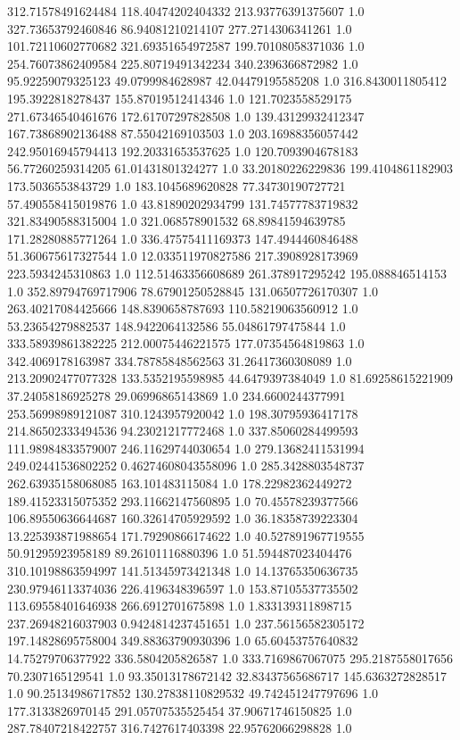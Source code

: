312.71578491624484	118.40474202404332	213.93776391375607	1.0
327.73653792460846	86.94081210214107	277.2714306341261	1.0
101.72110602770682	321.69351654972587	199.70108058371036	1.0
254.76073862409584	225.80719491342234	340.2396366872982	1.0
95.92259079325123	49.0799984628987	42.04479195585208	1.0
316.8430011805412	195.3922818278437	155.87019512414346	1.0
121.7023558529175	271.67346540461676	172.61707297828508	1.0
139.43129932412347	167.73868902136488	87.55042169103503	1.0
203.16988356057442	242.95016945794413	192.20331653537625	1.0
120.7093904678183	56.77260259314205	61.01431801324277	1.0
33.20180226229836	199.4104861182903	173.5036553843729	1.0
183.1045689620828	77.34730190727721	57.490558415019876	1.0
43.81890202934799	131.74577783719832	321.83490588315004	1.0
321.068578901532	68.89841594639785	171.28280885771264	1.0
336.47575411169373	147.4944460846488	51.360675617327544	1.0
12.033511970827586	217.3908928173969	223.5934245310863	1.0
112.51463356608689	261.378917295242	195.088846514153	1.0
352.89794769717906	78.67901250528845	131.06507726170307	1.0
263.40217084425666	148.8390658787693	110.58219063560912	1.0
53.23654279882537	148.9422064132586	55.04861797475844	1.0
333.58939861382225	212.00075446221575	177.07354564819863	1.0
342.4069178163987	334.78785848562563	31.26417360308089	1.0
213.20902477077328	133.5352195598985	44.6479397384049	1.0
81.69258615221909	37.24058186925278	29.06996865143869	1.0
234.6600244377991	253.56998989121087	310.1243957920042	1.0
198.30795936417178	214.86502333494536	94.23021217772468	1.0
337.85060284499593	111.98984833579007	246.11629744030654	1.0
279.13682411531994	249.02441536802252	0.46274608043558096	1.0
285.3428803548737	262.63935158068085	163.101483115084	1.0
178.22982362449272	189.41523315075352	293.11662147560895	1.0
70.45578239377566	106.89550636644687	160.32614705929592	1.0
36.18358739223304	13.225393871988654	171.79290866174622	1.0
40.527891967719555	50.91295923958189	89.26101116880396	1.0
51.594487023404476	310.10198863594997	141.51345973421348	1.0
14.13765350636735	230.97946113374036	226.4196348396597	1.0
153.87105537735502	113.69558401646938	266.6912701675898	1.0
1.833139311898715	237.26948216037903	0.9424814237451651	1.0
237.56156582305172	197.14828695758004	349.88363790930396	1.0
65.60453757640832	14.75279706377922	336.5804205826587	1.0
333.7169867067075	295.2187558017656	70.2307165129541	1.0
93.35013178672142	32.83437565686717	145.6363272828517	1.0
90.25134986717852	130.27838110829532	49.742451247797696	1.0
177.3133826970145	291.05707535525454	37.90671746150825	1.0
287.78407218422757	316.7427617403398	22.95762066298828	1.0
